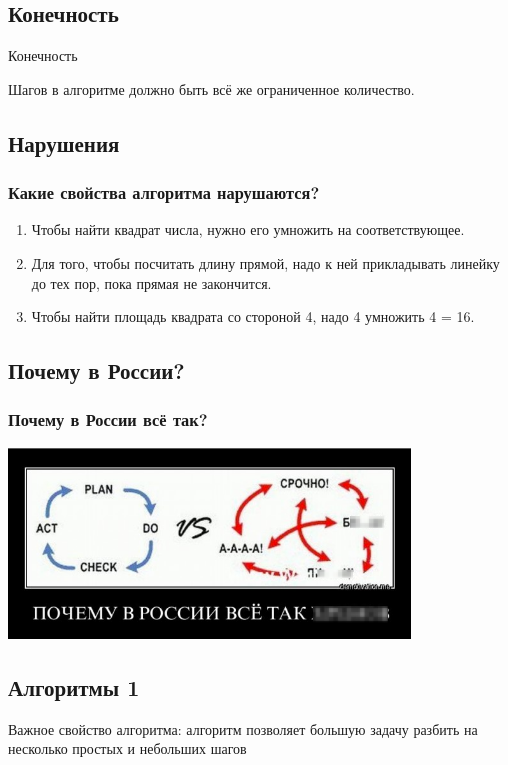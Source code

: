\documentclass[compress,red]{beamer}
\begin{document}
\subsection{Конечность}
\begin{frame}
  \begin{center}
    \Huge{Конечность}
  \end{center}
  \begin{center}
    \Large{Шагов в алгоритме должно быть всё же ограниченное количество.}
  \end{center}
\end{frame}

\subsection{Нарушения}
\begin{frame}[fragile]
  \frametitle{Какие свойства алгоритма нарушаются?}
  \begin{enumerate}
      \item Чтобы найти квадрат числа, нужно его умножить на соответствующее.
      \item Для того, чтобы посчитать длину прямой, надо к ней прикладывать линейку до тех пор, пока прямая не закончится.
      \item Чтобы найти площадь квадрата со стороной 4, надо 4 умножить 4 = 16.
  \end{enumerate}
\end{frame}

\subsection{Почему в России?}
\begin{frame}[fragile]
  \frametitle{Почему в России всё так?}
  \centerline{\includegraphics[width=0.8\textwidth]{images/russia.png}}
\end{frame}

\subsection{Алгоритмы 1}
\begin{frame}
  \begin{center}
    \Large{Важное свойство алгоритма: алгоритм позволяет большую задачу разбить на несколько простых и небольших шагов}
  \end{center}
\end{frame}
\end{document}
